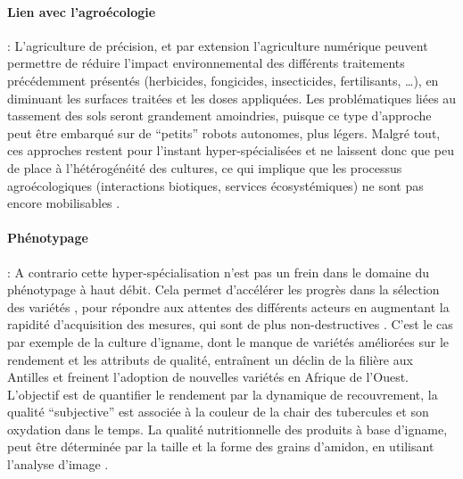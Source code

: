 \documentclass[../thesis.tex]{subfiles}
\begin{document}
    \paragraph{Lien avec l'agroécologie} : L'agriculture de précision, et par extension l'agriculture numérique peuvent permettre de réduire l'impact environnemental des différents traitements précédemment présentés (herbicides, fongicides, insecticides, fertilisants, \dots), en diminuant les surfaces traitées et les doses appliquées. Les problématiques liées au tassement des sols seront grandement amoindries, puisque ce type d'approche peut être embarqué sur de ``petits'' robots autonomes, plus légers. Malgré tout, ces approches restent pour l'instant hyper-spécialisées et ne laissent donc que peu de place à l'hétérogénéité des cultures, ce qui implique que les processus agroécologiques (interactions biotiques, services écosystémiques) ne sont pas encore mobilisables \cite[p.~81]{caquet2020agroecologie}.
    
    
    \paragraph{Phénotypage} : A contrario cette hyper-spécialisation n'est pas un frein dans le domaine du phénotypage à haut débit. Cela permet d'accélérer les progrès dans la sélection des variétés \cite{cabrera2012high}, pour répondre aux attentes des différents acteurs en augmentant la rapidité d'acquisition des mesures, qui sont de plus non-destructives \cite{jiang2020convolutional}. C'est le cas par exemple de la culture d'igname, dont le manque de variétés améliorées sur le rendement et les attributs de qualité, entraînent un déclin de la filière aux Antilles et freinent l'adoption de nouvelles variétés en Afrique de l'Ouest. L'objectif est de quantifier le rendement par la dynamique de recouvrement, la qualité ``subjective'' est associée à la couleur de la chair des tubercules et son oxydation dans le temps. La qualité nutritionnelle des produits à base d'igname, peut être déterminée par la taille et la forme des grains d'amidon, en utilisant l'analyse d'image \cite{mell:dumas-02138698, cornet:hal-02791432}.
    
\end{document}
